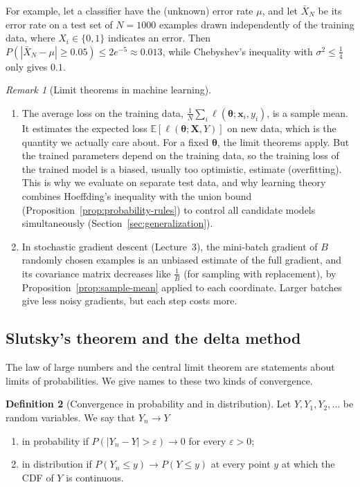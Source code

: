 \documentclass[11pt]{article}
\newcommand{\E}{\mathbb{E}}
\theoremstyle{definition}
\newtheorem{definition}{Definition}[section]
\theoremstyle{plain}
\theoremstyle{remark}
\newtheorem{remark}[definition]{Remark}
\begin{document}
For example, let a classifier have the (unknown) error rate $\mu$, and let $\bar X_N$ be its error rate on a test set of $N = 1000$ examples drawn independently of the training data, where $X_i \in \{0, 1\}$ indicates an error. Then $P(|\bar X_N - \mu| \geq 0.05) \leq 2e^{-5} \approx 0.013$, while Chebyshev's inequality with $\sigma^2 \leq \frac{1}{4}$ only gives $0.1$.

\begin{remark}[Limit theorems in machine learning]
    \begin{enumerate}
        \item The average loss on the training data, $\frac{1}{N}\sum_i \ell(\boldsymbol{\theta}; \mathbf{x}_i, y_i)$, is a sample mean. It estimates the expected loss $\E[\ell(\boldsymbol{\theta}; \mathbf{X}, Y)]$ on new data, which is the quantity we actually care about. For a fixed $\boldsymbol{\theta}$, the limit theorems apply. But the trained parameters depend on the training data, so the training loss of the trained model is a biased, usually too optimistic, estimate (overfitting). This is why we evaluate on separate test data, and why learning theory combines Hoeffding's inequality with the union bound (Proposition~\ref{prop:probability-rules}) to control all candidate models simultaneously (Section~\ref{sec:generalization}).
        \item In stochastic gradient descent (Lecture~3), the mini-batch gradient of $B$ randomly chosen examples is an unbiased estimate of the full gradient, and its covariance matrix decreases like $\frac{1}{B}$ (for sampling with replacement), by Proposition~\ref{prop:sample-mean} applied to each coordinate. Larger batches give less noisy gradients, but each step costs more.
    \end{enumerate}
\end{remark}

\subsection{Slutsky's theorem and the delta method}\label{sec:delta-method}

The law of large numbers and the central limit theorem are statements about limits of probabilities. We give names to these two kinds of convergence.

\begin{definition}[Convergence in probability and in distribution]\label{def:convergence}
    Let $Y, Y_1, Y_2, \ldots$ be random variables. We say that $Y_n \to Y$
    \begin{enumerate}
        \item in probability if $P(|Y_n - Y| > \varepsilon) \to 0$ for every $\varepsilon > 0$;
        \item in distribution if $P(Y_n \leq y) \to P(Y \leq y)$ at every point $y$ at which the CDF of $Y$ is continuous.
    \end{enumerate}
\end{definition}
\end{document}
